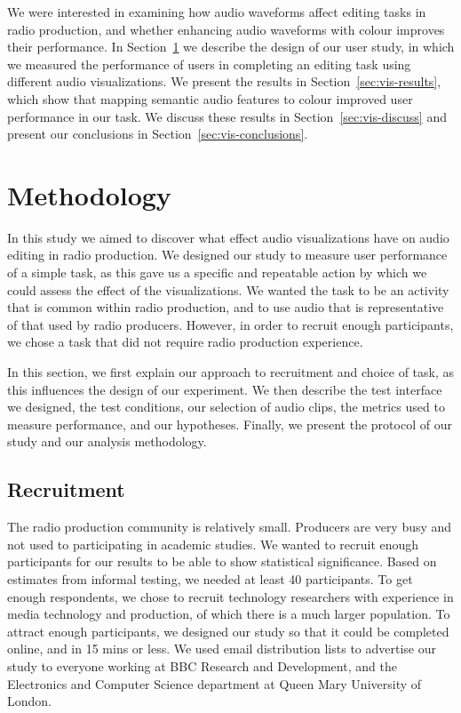 We were interested in examining how audio waveforms affect editing tasks in radio production, and whether enhancing
audio waveforms with colour improves their performance. In Section~\ref{sec:vis-method} we describe the design of our
user study, in which we measured the performance of users in completing an editing task using different audio
visualizations. We present the results in Section~\ref{sec:vis-results}, which show that mapping semantic audio
features to colour improved user performance in our task. We discuss these results in Section~\ref{sec:vis-discuss} and
present our conclusions in Section~\ref{sec:vis-conclusions}.











\section{Methodology}\label{sec:vis-method}

In this study we aimed to discover what effect audio visualizations have on audio editing in radio production.  We
designed our study to measure user performance of a simple task, as this gave us a specific and repeatable action by
which we could assess the effect of the visualizations.  We wanted the task to be an activity that is common within
radio production, and to use audio that is representative of that used by radio producers.  However, in order to
recruit enough participants, we chose a task that did not require radio production experience.

In this section, we first explain our approach to recruitment and choice of task, as this influences the design of
our experiment. We then describe the test interface we designed, the test conditions, our selection of audio clips, the
metrics used to measure performance, and our hypotheses.  Finally, we present the protocol of our study and our
analysis methodology.

\subsection{Recruitment}
The radio production community is relatively small. Producers are very busy and not used to participating in academic
studies.  We wanted to recruit enough participants for our results to be able to show statistical significance. Based
on estimates from informal testing, we needed at least 40 participants.  To get enough respondents, we chose to recruit
technology researchers with experience in media technology and production, of which there is a much larger population.
To attract enough participants, we designed our study so that it could be completed online, and in 15 mins or less.  We
used email distribution lists to advertise our study to everyone working at BBC Research and Development, and the
Electronics and Computer Science department at Queen Mary University of London.

